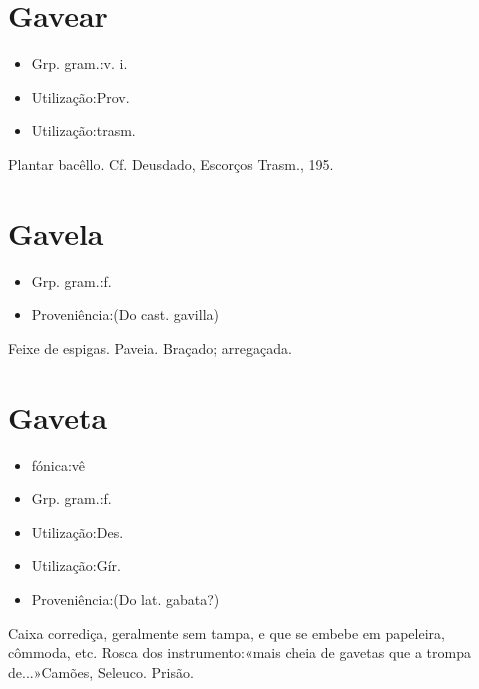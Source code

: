 \section{Gavear}
\begin{itemize}
\item {Grp. gram.:v. i.}
\end{itemize}
\begin{itemize}
\item {Utilização:Prov.}
\end{itemize}
\begin{itemize}
\item {Utilização:trasm.}
\end{itemize}
Plantar bacêllo. Cf. Deusdado, \textunderscore Escorços Trasm.\textunderscore , 195.
\section{Gavela}
\begin{itemize}
\item {Grp. gram.:f.}
\end{itemize}
\begin{itemize}
\item {Proveniência:(Do cast. \textunderscore gavilla\textunderscore )}
\end{itemize}
Feixe de espigas.
Paveia.
Braçado; arregaçada.
\section{Gaveta}
\begin{itemize}
\item {fónica:vê}
\end{itemize}
\begin{itemize}
\item {Grp. gram.:f.}
\end{itemize}
\begin{itemize}
\item {Utilização:Des.}
\end{itemize}
\begin{itemize}
\item {Utilização:Gír.}
\end{itemize}
\begin{itemize}
\item {Proveniência:(Do lat. \textunderscore gabata\textunderscore ?)}
\end{itemize}
Caixa corrediça, geralmente sem tampa, e que se embebe em papeleira, cômmoda, etc.
Rosca dos instrumento:«\textunderscore mais cheia de gavetas que a trompa de...\textunderscore »Camões, \textunderscore Seleuco\textunderscore .
Prisão.
